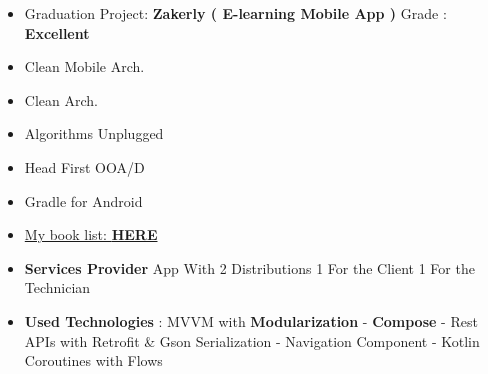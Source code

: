 \documentclass[10pt,a4paper,ragged2e,withhyper]{altacv}
\begin{document}
\begin{paracol}{2}
{\begin{itemize}
        \end{itemize}}


        \begin{itemize}
            \item Graduation Project: \textbf{Zakerly ( E-learning Mobile App )} Grade : \textbf{Excellent}
        \end{itemize}


        \begin{multicols}{3}

        {\small\begin{itemize}
                   \item[\textcolor{PrimaryColor}{\faBook}] Clean Mobile Arch.
                   \item[\textcolor{PrimaryColor}{\faBook}] Clean Arch.
                   \item[\textcolor{PrimaryColor}{\faBook}] Algorithms Unplugged
                   \item[\textcolor{PrimaryColor}{\faBook}] Head First OOA/D
                   \item[\textcolor{PrimaryColor}{\faBook}] Gradle for Android
                   \item[\textcolor{PrimaryColor}{\faTrello}] \href{https://trello.com/b/pkZlgQVu/my-readings-board}{My book list: \textbf{\textcolor{TertiaryColor}{HERE}}}
        \end{itemize}}

        \end{multicols}

    \end{paracol}

    \vspace{2px}

    \vspace{2px}


    \hypertarget{samoolah}{}



    \begin{itemize}
        \item \textbf{Services Provider} App With 2 Distributions 1 For the Client 1 For the Technician
        \item \textbf{Used Technologies} : MVVM with \textbf{Modularization} - \textbf{Compose} - Rest APIs with Retrofit \& Gson Serialization - Navigation Component - Kotlin Coroutines with Flows
    \end{itemize}
    \divider
\end{document}
